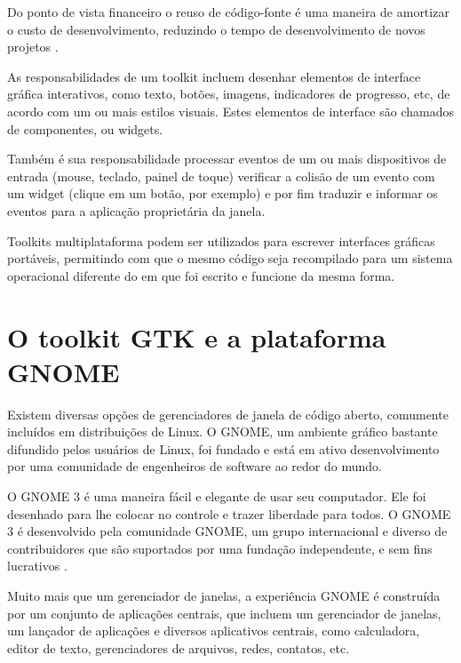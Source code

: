 Do ponto de vista financeiro o reuso de código-fonte é uma maneira de amortizar
o custo de desenvolvimento, reduzindo o tempo de desenvolvimento de novos
projetos .

As responsabilidades de um toolkit incluem desenhar elementos de interface
gráfica interativos, como texto, botões, imagens, indicadores de progresso,
etc, de acordo com um ou mais estilos visuais. Estes elementos de interface
são chamados de componentes, ou widgets.

Também é sua responsabilidade processar eventos de um ou mais dispositivos de
entrada (mouse, teclado, painel de toque) verificar a colisão de um evento com
um widget (clique em um botão, por exemplo) e por fim traduzir e informar os
eventos para a aplicação proprietária da janela.

Toolkits multiplataforma podem ser utilizados para escrever interfaces gráficas
portáveis, permitindo com que o mesmo código seja recompilado para um sistema
operacional diferente do em que foi escrito e funcione da mesma forma.

\section{O toolkit GTK e a plataforma GNOME}

Existem diversas opções de gerenciadores de janela de código aberto, comumente
incluídos em distribuições de Linux. O GNOME, um ambiente gráfico bastante
difundido pelos usuários de Linux, foi fundado e está em ativo desenvolvimento
por uma comunidade de engenheiros de software ao redor do mundo.

\begin{citacao}
    O GNOME 3 é uma maneira fácil e elegante de usar seu computador.
    Ele foi desenhado para lhe colocar no controle e trazer liberdade para
    todos. O GNOME 3 é desenvolvido pela comunidade GNOME, um grupo
    internacional e diverso de contribuidores que são suportados por uma
    fundação independente, e sem fins lucrativos \cite{gnome-org}.
\end{citacao}

Muito mais que um gerenciador de janelas, a experiência GNOME é construída por
um conjunto de aplicações centrais, que incluem um gerenciador de janelas, um
lançador de aplicações e diversos aplicativos centrais, como calculadora,
editor de texto, gerenciadores de arquivos, redes, contatos, etc.

